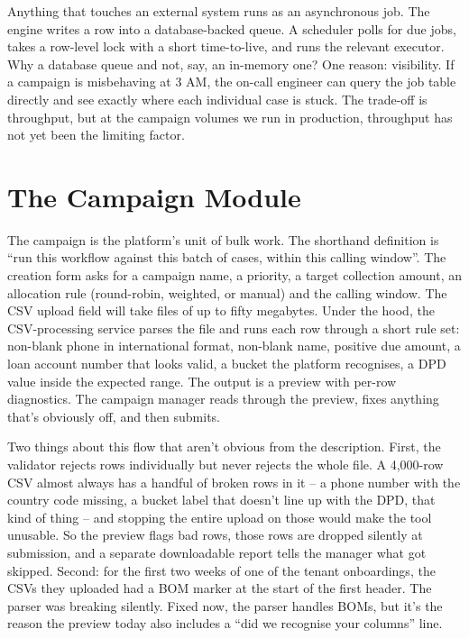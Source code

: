 Anything that touches an external system runs as an asynchronous job. The engine writes a row into a database-backed queue. A scheduler polls for due jobs, takes a row-level lock with a short time-to-live, and runs the relevant executor. Why a database queue and not, say, an in-memory one? One reason: visibility. If a campaign is misbehaving at 3 AM, the on-call engineer can query the job table directly and see exactly where each individual case is stuck. The trade-off is throughput, but at the campaign volumes we run in production, throughput has not yet been the limiting factor.

\section{The Campaign Module}
\label{sec:campaign}
The campaign is the platform's unit of bulk work. The shorthand definition is ``run this workflow against this batch of cases, within this calling window''. The creation form asks for a campaign name, a priority, a target collection amount, an allocation rule (round-robin, weighted, or manual) and the calling window. The CSV upload field will take files of up to fifty megabytes. Under the hood, the CSV-processing service parses the file and runs each row through a short rule set: non-blank phone in international format, non-blank name, positive due amount, a loan account number that looks valid, a bucket the platform recognises, a DPD value inside the expected range. The output is a preview with per-row diagnostics. The campaign manager reads through the preview, fixes anything that's obviously off, and then submits.

Two things about this flow that aren't obvious from the description. First, the validator rejects rows individually but never rejects the whole file. A 4,000-row CSV almost always has a handful of broken rows in it -- a phone number with the country code missing, a bucket label that doesn't line up with the DPD, that kind of thing -- and stopping the entire upload on those would make the tool unusable. So the preview flags bad rows, those rows are dropped silently at submission, and a separate downloadable report tells the manager what got skipped. Second: for the first two weeks of one of the tenant onboardings, the CSVs they uploaded had a BOM marker at the start of the first header. The parser was breaking silently. Fixed now, the parser handles BOMs, but it's the reason the preview today also includes a ``did we recognise your columns'' line.

